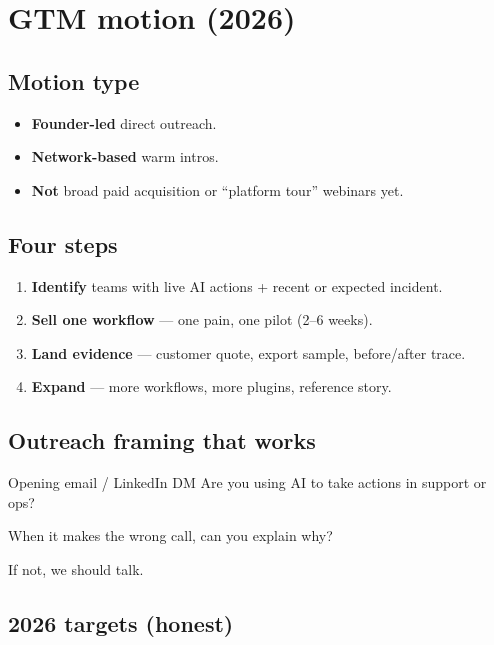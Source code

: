 \section{GTM motion (2026)}

\subsection{Motion type}

\begin{itemize}
  \item \textbf{Founder-led} direct outreach.
  \item \textbf{Network-based} warm intros.
  \item \textbf{Not} broad paid acquisition or ``platform tour'' webinars yet.
\end{itemize}

\subsection{Four steps}

\begin{enumerate}
  \item \textbf{Identify} teams with live AI actions + recent or expected incident.
  \item \textbf{Sell one workflow} --- one pain, one pilot (2--6 weeks).
  \item \textbf{Land evidence} --- customer quote, export sample, before/after trace.
  \item \textbf{Expand} --- more workflows, more plugins, reference story.
\end{enumerate}

\subsection{Outreach framing that works}

\begin{insightbox}{Opening email / LinkedIn DM}
Are you using AI to take actions in support or ops?

When it makes the wrong call, can you explain why?

If not, we should talk.
\end{insightbox}

\subsection{2026 targets (honest)}

